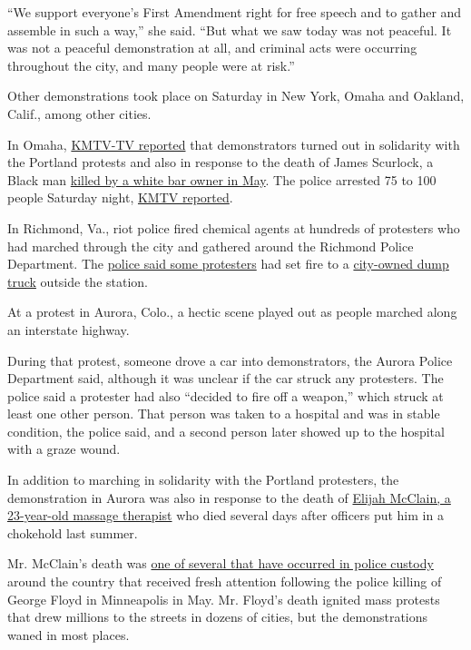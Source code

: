 ``We support everyone's First Amendment right for free speech and to
gather and assemble in such a way,'' she said. ``But what we saw today
was not peaceful. It was not a peaceful demonstration at all, and
criminal acts were occurring throughout the city, and many people were
at risk.''

Other demonstrations took place on Saturday in New York, Omaha and
Oakland, Calif., among other cities.

In Omaha,
\href{https://www.3newsnow.com/news/local-news/midtown-protest-for-james-scurlock-portland-unrest-leads-to-arrests}{KMTV-TV
reported} that demonstrators turned out in solidarity with the Portland
protests and also in response to the death of James Scurlock, a Black
man
\href{https://omaha.com/news/local/veteran-federal-prosecutor-to-lead-grand-jury-probe-into-james-scurlocks-death/article_f2f0f66d-8400-5923-b441-d2f490c512c7.html}{killed
by a white bar owner in May}. The police arrested 75 to 100 people
Saturday night,
\href{https://www.3newsnow.com/news/local-news/midtown-protest-for-james-scurlock-portland-unrest-leads-to-arrests}{KMTV
reported}.

In Richmond, Va., riot police fired chemical agents at hundreds of
protesters who had marched through the city and gathered around the
Richmond Police Department. The
\href{https://twitter.com/RichmondPolice/status/1287226950822617088}{police
said some protesters} had set fire to a
\href{https://twitter.com/Rob_Desir/status/1287226202592346112?s=20}{city-owned
dump truck} outside the station.

At a protest in Aurora, Colo., a hectic scene played out as people
marched along an interstate highway.

During that protest, someone drove a car into demonstrators, the Aurora
Police Department said, although it was unclear if the car struck any
protesters. The police said a protester had also ``decided to fire off a
weapon,'' which struck at least one other person. That person was taken
to a hospital and was in stable condition, the police said, and a second
person later showed up to the hospital with a graze wound.

In addition to marching in solidarity with the Portland protesters, the
demonstration in Aurora was also in response to the death of
\href{https://www.nytimes3xbfgragh.onion/article/who-was-elijah-mcclain.html}{Elijah
McClain, a 23-year-old massage therapist} who died several days after
officers put him in a chokehold last summer.

Mr. McClain's death was
\href{https://www.nytimes3xbfgragh.onion/2020/06/20/us/elijah-mcclain-police-killings.html}{one
of several that have occurred in police custody} around the country that
received fresh attention following the police killing of George Floyd in
Minneapolis in May. Mr. Floyd's death ignited mass protests that drew
millions to the streets in dozens of cities, but the demonstrations
waned in most places.

